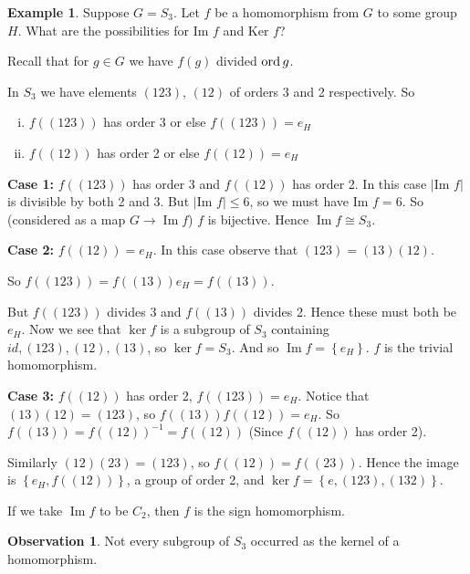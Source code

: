 \documentclass{article}
\theoremstyle{definition} \newtheorem*{definition}{Definition}
\newtheorem*{exmp}{Example} \newtheorem*{exmps}{Examples}
\newtheorem*{obvs}{Observation}
\DeclareMathOperator{\Ima}{Im} \DeclareMathOperator{\Sym}{Sym}
\begin{document}
\begin{exmp} Suppose $G=S_3$. Let $f$ be a homomorphism from $G$ to some group
  $H$. What are the possibilities for $\text{Im }f$ and $\text{Ker }f$?

  Recall that for $g \in G$ we have $f(g)$ divided $\operatorname{\text{ord}} g$.

  In $S_3$ we have elements $(123)$, $(12)$ of orders 3 and 2 respectively. So
\begin{enumerate}[(i)] \item $f\left( (123) \right)$ has order 3 or else $f\left(
    (123) \right)=e_H$ \item $f\left( (12) \right)$ has order 2 or else
      $f\left( (12) \right)=e_H$ \end{enumerate}

  \textbf{Case 1:} $f\left( (123) \right)$ has order 3 and $f\left(
  (12)\right)$ has order 2. In this case $|\text{Im }f|$ is divisible by both 2
  and 3. But $|\text{Im }f| \leq 6$, so we must have $\text{Im } f=6$. So
  (considered as a map $G \rightarrow \Ima f$) $f$ is bijective. Hence $\Ima f
  \cong S_3$.

  \textbf{Case 2:} $f\left( (12) \right)=e_H$. In this case observe that
  $(123)=(13)(12)$.

  So $f\left( (123) \right)=f\left( (13) \right)e_H=f\left( (13) \right)$.

  But $f\left( (123) \right)$ divides 3 and $f\left( (13) \right)$ divides 2.
  Hence these must both be $e_H$. Now we see that $\ker f$ is a subgroup of
  $S_3$ containing $id, (123), (12), (13)$, so $\ker f=S_3$. And so $\Ima f =
  \left\{ e_H \right\}$. $f$ is the trivial homomorphism.

  \textbf{Case 3:} $f\left( (12) \right)$ has order 2, $f\left( (123)
  \right)=e_H$. Notice that $(13)(12)=(123)$, so $f\left( (13) \right)f\left(
  (12) \right)=e_H$. So $f\left( (13) \right)=f\left( (12) \right)^{-1}=f\left(
  (12) \right)$ (Since $f\left( (12) \right)$ has order 2).

  Similarly $(12)(23)=(123)$, so $f\left( (12) \right)=f\left( (23) \right)$.
  Hence the image is $\left\{ e_H,f\left( (12) \right) \right\}$, a group of
  order 2, and $\ker f=\left\{ e,(123),(132) \right\}$.

  If we take $\Ima f$ to be $C_2$, then $f$ is the sign homomorphism.\\
  \begin{obvs}
  
  Not every subgroup of $S_3$ occurred as the kernel of a homomorphism.
\end{obvs} \end{exmp}
\end{document}
